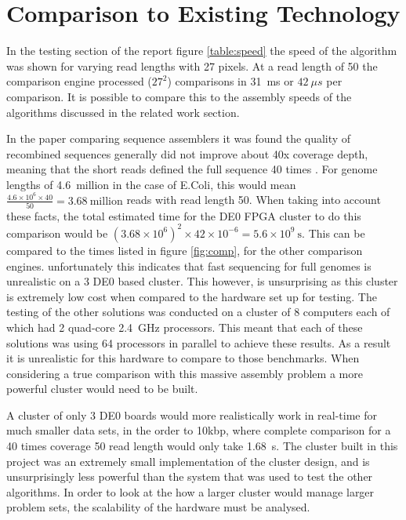 \section{Comparison to Existing Technology}

In the testing section of the report figure \ref{table:speed} the speed of the algorithm was shown for varying read lengths with 27 pixels. At a read length of 50 the comparison engine processed ($27^2$) comparisons in 31~ms or $42~{\mu}s$ per comparison. It is possible to compare this to the assembly speeds of the algorithms discussed in the related work section. 

In the paper comparing sequence assemblers it was found the quality of recombined sequences generally did not improve about 40x coverage depth, meaning that the short reads defined the full sequence 40 times \cite{lin2011comparative}. For genome lengths of 4.6~million in the case of E.Coli, this would mean $\frac{4.6\times 10^6 \times 40}{50} = 3.68~\text{million}$ reads with read length 50. When taking into account these facts, the total estimated time for the DE0 FPGA cluster to do this comparison would be $(3.68\times 10^{6})^2 \times 42 \times 10^{-6} = 5.6\times10^{9}~\text{s}$. This can be compared to the times listed in figure \ref{fig:comp}, for the other comparison engines. unfortunately this indicates that fast sequencing for full genomes is unrealistic on a 3 DE0 based cluster. This however, is unsurprising as this cluster is extremely low cost when compared to the hardware set up for testing. The testing of the other solutions was conducted on a cluster of 8 computers each of which had 2 quad-core 2.4~GHz processors. This meant that each of these solutions was using 64 processors in parallel to achieve these results. As a result it is unrealistic for this hardware to compare to those benchmarks. When considering a true comparison with this massive assembly problem a more powerful cluster would need to be built.



A cluster of only 3 DE0 boards would more realistically work in real-time for much smaller data sets, in the order to 10kbp, where complete comparison for a 40 times coverage 50 read length would only take 1.68~s. The cluster built in this project was an extremely small implementation of the cluster design, and is unsurprisingly less powerful than the system that was used to test the other algorithms. In order to look at the how a larger cluster would manage larger problem sets, the scalability of the hardware must be analysed.


